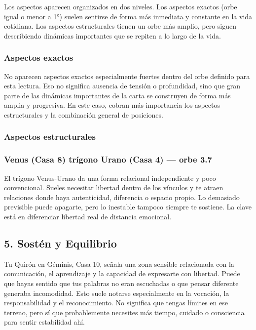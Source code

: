\documentclass[11pt,a4paper]{article}\usepackage[utf8]{inputenc}
\begin{document}
Los aspectos aparecen organizados en dos niveles. Los aspectos exactos (orbe igual o menor a 1°) suelen sentirse de forma más inmediata y constante en la vida cotidiana. Los aspectos estructurales tienen un orbe más amplio, pero siguen describiendo dinámicas importantes que se repiten a lo largo de la vida.



\subsubsection*{Aspectos exactos}
No aparecen aspectos exactos especialmente fuertes dentro del orbe definido para esta lectura. Eso no significa ausencia de tensión o profundidad, sino que gran parte de las dinámicas importantes de la carta se construyen de forma más amplia y progresiva. En este caso, cobran más importancia los aspectos estructurales y la combinación general de posiciones.

\subsubsection*{Aspectos estructurales}
\subsubsection*{Venus (Casa 8) trígono Urano (Casa 4) --- orbe 3.7\textdegree}
El trígono Venus-Urano da una forma relacional independiente y poco convencional. Sueles necesitar libertad dentro de los vínculos y te atraen relaciones donde haya autenticidad, diferencia o espacio propio. Lo demasiado previsible puede apagarte, pero lo inestable tampoco siempre te sostiene. La clave está en diferenciar libertad real de distancia emocional.



\subsection{5. Sostén y Equilibrio}

Tu Quirón en Géminis, Casa 10, señala una zona sensible relacionada con la comunicación, el aprendizaje y la capacidad de expresarte con libertad. Puede que hayas sentido que tus palabras no eran escuchadas o que pensar diferente generaba incomodidad. Esto suele notarse especialmente en la vocación, la responsabilidad y el reconocimiento. No significa que tengas límites en ese terreno, pero sí que probablemente necesites más tiempo, cuidado o consciencia para sentir estabilidad ahí.
\end{document}
